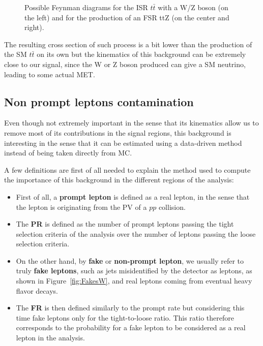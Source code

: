 \documentclass[a4paper, 10pt, openright]{report}
\begin{document}
\begin{figure}[htbp]
\begin{minipage}[b]{.29\textwidth}
{
}
\end{minipage} 
\caption{Possible Feynman diagrams for the \ac{ISR} $t \bar t$ with a W/Z boson (on the left) and for the production of an \ac{FSR} ttZ (on the center and right).}
\label{fig:ttV}
\end{figure}

The resulting cross section of such process is a bit lower than the production of the \ac{SM} $t \bar t$ on its own but the kinematics of this background can be extremely close to our signal, since the W or Z boson produced can give a \ac{SM} neutrino, leading to some actual \ac{MET}.

\subsection{Non prompt leptons contamination} \label{subsection:Fakes}

Even though not extremely important in the sense that its kinematics allow us to remove most of its contributions in the signal regions, this background is interesting in the sense that it can be estimated using a data-driven method instead of being taken directly from \ac{MC}.

A few definitions are first of all needed to explain the method used to compute the importance of this background in the different regions of the analysis:
\begin{itemize}
\item First of all, a \textbf{prompt lepton} is defined as a real lepton, in the sense that the lepton is originating from the \ac{PV} of a $pp$ collision.
\item The \textbf{\ac{PR}} is defined as the number of prompt leptons passing the tight selection criteria of the analysis over the number of leptons passing the loose selection criteria. 
\item On the other hand, by \textbf{fake} or \textbf{non-prompt lepton}, we usually refer to truly \textbf{fake leptons}, such as jets misidentified by the detector as leptons, as shown in Figure~\ref{fig:FakesW}, and real leptons coming from eventual heavy flavor decays.
\item The \textbf{\ac{FR}} is then defined similarly to the prompt rate but considering this time fake leptons only for the tight-to-loose ratio. This ratio therefore corresponds to the probability for a fake lepton to be considered as a real lepton in the analysis.
\end{itemize}
\end{document}
